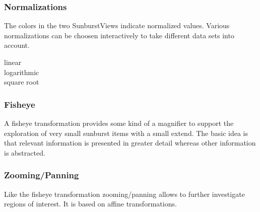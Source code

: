 \subsubsection{Normalizations}
The colors in the two SunburstViews indicate normalized values. Various normalizations can be choosen interactively to take different data sets into account.

\begin{description}
\item[linear]
\item[logarithmic]
\item[square root]
\end{description}

\subsubsection{Fisheye}
A fisheye transformation provides some kind of a magnifier to support the exploration of very small sunburst items with a small extend. The basic idea is that relevant information is presented in greater detail whereas other information is abstracted.

\subsubsection{Zooming/Panning}
Like the fisheye transformation zooming/panning allows to further investigate regions of interest. It is based on affine transformations.

